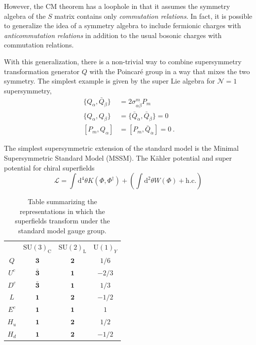 However, the CM theorem has a loophole in that it assumes the
symmetry algebra of the $S$ matrix contains only \emph{commutation
relations}. In fact, it is possible to generalize the idea of a symmetry algebra to include
fermionic charges with \emph{anticommutation relations} in addition to the
usual bosonic charges with commutation relations. 

With this generalization, there is a non-trivial way to combine
supersymmetry transformation generator $Q$ with the Poincar\'{e} group
in a way that mixes the two
symmetry. The simplest example is given by the super Lie algebra for $\mathcal N=1$
supersymmetry,
\begin{align}
~\{ Q_{\alpha},\bar Q_{\dot{\beta}}\} &= 2\sigma^m_{\alpha\dot\beta} P_m \nonumber\\
~\{ Q_{\alpha},Q_{\beta}\} &= \{ \bar Q_{\dot\alpha},\bar Q_{\dot\beta}\} = 0\nonumber\\
~[ P_m, Q_{\alpha}] &= [P_m,\bar Q_{\dot\alpha}] = 0~.
\label{eqn:n1susy}
\end{align}

The simplest supersymmetric extension of the standard model is the
Minimal Supersymmetric Standard Model (MSSM). 
The K\"{a}hler potential and super potential for chiral superfields
\begin{equation}
\mathcal L = \int \mathrm{d}^4\theta K(\Phi,\Phi^{\dagger}) + \left (\int
 \mathrm{d}^2\theta W(\Phi) + \mathrm{h.c.} \right)
\label{eqn:mssmlag}
\end{equation}

\begin{table}
\centering
\begin{tabular}{c|ccc}
&$\mathrm{SU(3)}_{\mathrm{C}}$&$\mathrm{SU(2)}_{\mathrm{L}}$&$\mathrm{U(1)}_Y$ \\
$Q$ & $\mathbf{3}$ & $\mathbf{2}$ & $1/6$\\
$U^c$ & $\mathbf{\bar 3}$ & $\mathbf{1}$ & $-2/3$\\
$D^c$ & $\mathbf{\bar 3}$ & $\mathbf{1}$ & $1/3$\\
$L$ & $\mathbf{1}$ & $\mathbf{2}$ & $-1/2$\\
$E^c$ & $\mathbf{1}$ & $\mathbf{1}$ & $1$\\\hline
$H_u$ & $\mathbf{1}$ & $\mathbf{2}$ & $1/2$\\
$H_d$ & $\mathbf{1}$ & $\mathbf{2}$ & $-1/2$
\end{tabular}
\caption{\label{tab:representations} Table summarizing the
    representations in which the superfields transform under the standard
    model gauge group.}
\end{table}

